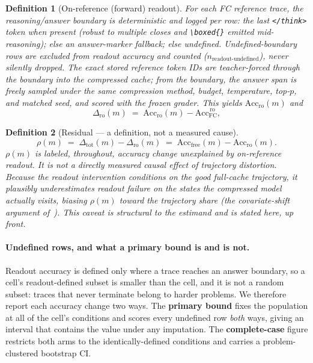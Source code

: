 \documentclass{article}
\newtheorem{definition}{Definition}
\newcommand{\accfc}{\mathrm{Acc}_{\mathrm{FC}}}
\newcommand{\accfree}[1]{\mathrm{Acc}_{\mathrm{free}}(#1)}
\newcommand{\accro}[1]{\mathrm{Acc}_{\mathrm{ro}}(#1)}
\newcommand{\dtot}[1]{\Delta_{\mathrm{tot}}(#1)}
\newcommand{\dro}[1]{\Delta_{\mathrm{ro}}(#1)}
\newcommand{\res}[1]{\rho(#1)}
\begin{document}
\begin{definition}[On-reference (forward) readout]
For each FC reference trace, the reasoning/answer boundary is deterministic and logged per row: the \emph{last} \texttt{</think>} token when present (robust to multiple closes and \texttt{\textbackslash boxed\{\}} emitted mid-reasoning); else an answer-marker fallback; else \emph{undefined}. Undefined-boundary rows are excluded from readout accuracy and counted ($n_{\mathrm{readout\text{-}undefined}}$), never silently dropped. The exact stored reference token IDs are teacher-forced through the boundary into the \emph{compressed} cache; from the boundary, the answer span is freely sampled under the same compression method, budget, temperature, top-$p$, and matched seed, and scored with the frozen grader. This yields $\accro{m}$ and
\begin{equation}
\dro{m} \;=\; \accro{m} - \accfc^{\,\mathrm{ro}} ,
\end{equation}
\end{definition}

\begin{definition}[Residual --- a definition, not a measured cause]
\begin{equation}
\res{m} \;=\; \dtot{m} - \dro{m} \;=\; \accfree{m} - \accro{m}.
\label{eq:residual}
\end{equation}
$\res{m}$ is labeled, throughout, \emph{accuracy change unexplained by on-reference readout}. It is not a directly measured causal effect of trajectory distortion. Because the readout intervention conditions on the good full-cache trajectory, it plausibly underestimates readout failure on the states the compressed model actually visits, biasing $\res{m}$ toward the trajectory share (the covariate-shift argument of~\citep{ross2011dagger}). This caveat is structural to the estimand and is stated here, up front.
\end{definition}

\paragraph{Undefined rows, and what a primary bound is and is not.} Readout accuracy is defined only where a trace reaches an answer boundary, so a cell's readout-defined subset is smaller than the cell, and it is not a random subset: traces that never terminate belong to harder problems. We therefore report each accuracy change two ways. The \textbf{primary bound} fixes the population at all of the cell's conditions and scores every undefined row \emph{both} ways, giving an interval that contains the value under any imputation. The \textbf{complete-case} figure restricts both arms to the identically-defined conditions and carries a problem-clustered bootstrap CI.
\end{document}
